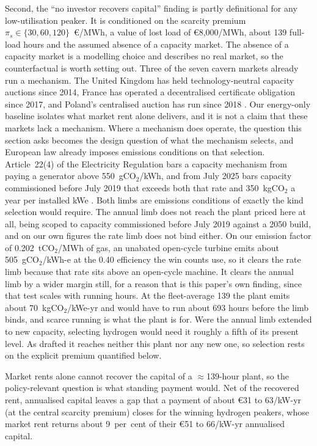 Second, the ``no investor recovers capital'' finding is partly definitional for any
low-utilisation peaker. It is conditioned on the scarcity premium
$\pi_s\in\{30,60,120\}$~\euro{}/MWh, a value of lost load of \euro{}8{,}000/MWh, about
139 full-load hours and the assumed absence of a capacity market. The absence of a capacity market is a modelling choice and describes no real market, so
the counterfactual is worth setting out. Three of the seven cavern markets already run a
mechanism. The United Kingdom has held technology-neutral capacity auctions since 2014,
France has operated a decentralised certificate obligation since 2017, and Poland's
centralised auction has run since 2018 \citep{ACER2023capacity}. Our energy-only
baseline isolates what market rent alone delivers, and it is not a claim that these
markets lack a mechanism. Where a mechanism does operate, the question this section asks becomes the design
question of what the mechanism selects, and European law already imposes emissions
conditions on that selection. Article~22(4) of the Electricity Regulation bars a
capacity mechanism from paying a generator above 550~gCO$_2$/kWh, and from July 2025
bars capacity commissioned before July 2019 that exceeds both that rate and 350~kgCO$_2$
a year per installed kWe \citep{EU2019ElectricityRegulation}. Both limbs are emissions conditions of
exactly the kind selection would require. The annual limb does not reach the plant priced
here at all, being scoped to capacity commissioned before July 2019 against a 2050 build,
and on our own figures the rate limb does not bind either. On our emission factor of
0.202~tCO$_2$/MWh of gas, an unabated open-cycle turbine emits about 505~gCO$_2$/kWh-e
at the 0.40 efficiency the win counts use, so it clears the rate limb because that rate
sits above an open-cycle machine. It clears the annual limb by a wider margin still, for
a reason that is this paper's own finding, since that test scales with running hours. At the fleet-average 139 the plant emits about 70~kgCO$_2$/kWe-yr and would have to run
about 693 hours before the limb binds, and scarce running is what the plant is for.
Were the annual limb extended to new capacity, selecting hydrogen would need it roughly a
fifth of its present level. As drafted it reaches neither this plant nor any new one, so
selection rests on the explicit premium quantified below.

Market rents alone cannot recover the capital of a $\approx$139-hour plant, so the
policy-relevant question is what standing payment would. Net of the recovered rent, annualised capital leaves a gap that a payment of about \euro{}31 to 63/kW-yr (at the central scarcity premium) closes for the winning hydrogen peakers, whose market rent
returns about 9~per~cent of their \euro{}51 to 66/kW-yr annualised capital.


